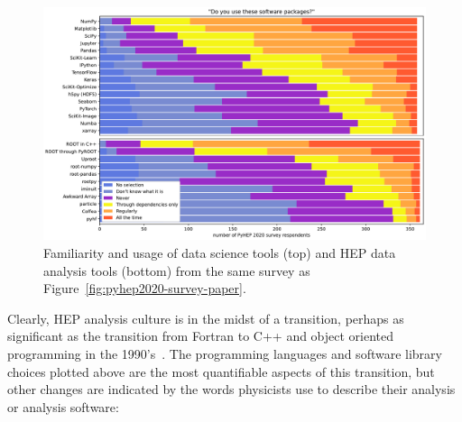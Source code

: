 \documentclass[12pt,a4paper]{article}
\begin{document}
\begin{figure}
\centering
\includegraphics[width=\linewidth]{fig/lhlhc-familiarity-with-packages-paper.pdf}

\caption{Familiarity and usage of data science tools (top) and HEP data analysis tools (bottom) from the same survey as Figure~\ref{fig:pyhep2020-survey-paper}. \label{fig:lhlhc-familiarity-with-packages-paper}}
\end{figure}

Clearly, HEP analysis culture is in the midst of a transition, perhaps as significant as the transition from Fortran to C++ and object oriented programming in the 1990's~\cite{Brun:2012cq}. The programming languages and software library choices plotted above are the most quantifiable aspects of this transition, but other changes are indicated by the words physicists use to describe their analysis or analysis software:
\end{document}
